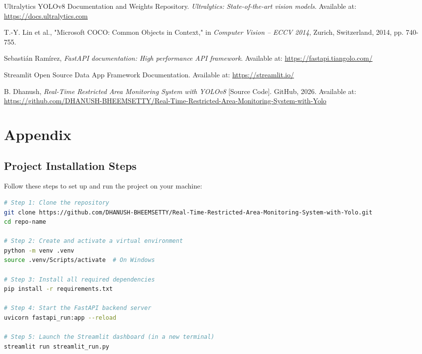 \documentclass[12pt,a4paper]{article}
\begin{document}
\begin{thebibliography}{9}

Ultralytics YOLOv8 Documentation and Weights Repository. \textit{Ultralytics: State-of-the-art vision models}. Available at: \url{https://docs.ultralytics.com}

T.-Y. Lin et al., "Microsoft COCO: Common Objects in Context," in \textit{Computer Vision – ECCV 2014}, Zurich, Switzerland, 2014, pp. 740-755.

Sebastián Ramírez, \textit{FastAPI documentation: High performance API framework}. Available at: \url{https://fastapi.tiangolo.com/}

Streamlit Open Source Data App Framework Documentation. Available at: \url{https://streamlit.io/}

B. Dhanush, \textit{Real-Time Restricted Area Monitoring System with YOLOv8} [Source Code]. GitHub, 2026. Available at: \url{https://github.com/DHANUSH-BHEEMSETTY/Real-Time-Restricted-Area-Monitoring-System-with-Yolo}

\end{thebibliography}

\newpage

\appendix
\section{Appendix}

\subsection{Project Installation Steps}
Follow these steps to set up and run the project on your machine:
\begin{lstlisting}[language=bash]
# Step 1: Clone the repository
git clone https://github.com/DHANUSH-BHEEMSETTY/Real-Time-Restricted-Area-Monitoring-System-with-Yolo.git
cd repo-name

# Step 2: Create and activate a virtual environment
python -m venv .venv
source .venv/Scripts/activate  # On Windows

# Step 3: Install all required dependencies
pip install -r requirements.txt

# Step 4: Start the FastAPI backend server
uvicorn fastapi_run:app --reload

# Step 5: Launch the Streamlit dashboard (in a new terminal)
streamlit run streamlit_run.py
\end{lstlisting}
\end{document}
